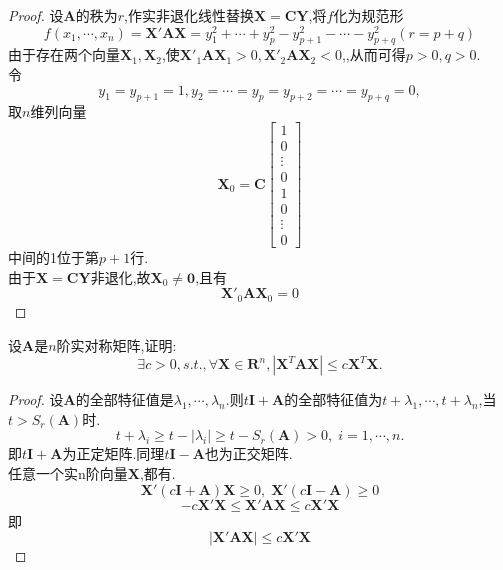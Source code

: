 \documentclass[lang=cn,11pt,normal]{elegantbook}
\begin{document}
	\begin{proof}
		设$\boldsymbol{A}$的秩为$r$,作实非退化线性替换$\boldsymbol{X}=\boldsymbol{CY}$,将$f$化为规范形
		$$
		f(x_1,\cdots,x_n)=\boldsymbol{X}'\boldsymbol{AX}=y_1^2+\cdots+y_p^2-y^2_{p+1}-\cdots-y^2_{p+q}(r=p+q)
		$$
		由于存在两个向量$\boldsymbol{X}_1,\boldsymbol{X}_2$,使$\boldsymbol{X}'_1\boldsymbol{AX}_1>0,\boldsymbol{X}'_2\boldsymbol{AX}_2<0$,,从而可得$p>0,q>0$.\\
		令
		$$
		y_1=y_{p+1}=1,y_2=\cdots=y_p=y_{p+2}=\cdots=y_{p+q}=0,
		$$
		取$n$维列向量
		$$
		\boldsymbol{X}_0=\boldsymbol{C}
		\begin{bmatrix}
		1\\0\\\vdots\\0\\1\\0\\\vdots\\0
		\end{bmatrix}
		$$
		中间的1位于第$p+1$行.\\
		由于$\boldsymbol{X}=\boldsymbol{CY}$非退化,故$\boldsymbol{X}_0\ne\boldsymbol{0}$,且有
		$$
		\boldsymbol{X}'_0\boldsymbol{AX}_0=0
		$$
	\end{proof}
	\begin{exercise}
		设$\boldsymbol{A}$是$n$阶实对称矩阵,证明:
		$$
		\exists c>0,s.t., \forall \boldsymbol{X}\in \boldsymbol{R}^n,|\boldsymbol{X}^T\boldsymbol{A}\boldsymbol{X}|\leq c\boldsymbol{X}^T\boldsymbol{X}.
		$$
	\end{exercise}
	\begin{proof}
		设$\boldsymbol{A}$的全部特征值是$\lambda_1,\cdots,\lambda_n$.则$t\boldsymbol{I}+\boldsymbol{A}$的全部特征值为$t+\lambda_1,\cdots,t+\lambda_n$,当$t>S_r(\boldsymbol{A})$时.
		$$
		t+\lambda_i\geq t-|\lambda_i|\geq t-S_r(\boldsymbol{A})>0,\;i=1,\cdots,n.
		$$
		即$t\boldsymbol{I}+\boldsymbol{A}$为正定矩阵.同理$t\boldsymbol{I}-\boldsymbol{A}$也为正交矩阵.\\
		任意一个实n阶向量$\boldsymbol{X}$,都有.
		$$
		\boldsymbol{X}'(c\boldsymbol{I}+\boldsymbol{A})\boldsymbol{X}\geqslant 0,\;\boldsymbol{X}'(c\boldsymbol{I}-\boldsymbol{A})\geqslant 0
		$$
		$$
		-c\boldsymbol{X}'\boldsymbol{X}\leqslant \boldsymbol{X}'\boldsymbol{AX}\leqslant c\boldsymbol{X}'\boldsymbol{X}
		$$
		即$$|\boldsymbol{X}'\boldsymbol{AX}|\leqslant c\boldsymbol{X}'\boldsymbol{X}$$
	\end{proof}
\end{document}
